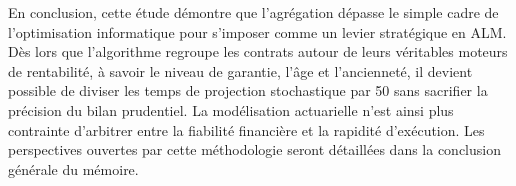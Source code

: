 En conclusion, cette étude démontre que l'agrégation dépasse le simple cadre de l'optimisation informatique pour s'imposer comme un levier stratégique en ALM. Dès lors que l'algorithme regroupe les contrats autour de leurs véritables moteurs de rentabilité, à savoir le niveau de garantie, l'âge et l'ancienneté, il devient possible de diviser les temps de projection stochastique par 50 sans sacrifier la précision du bilan prudentiel. La modélisation actuarielle n'est ainsi plus contrainte d'arbitrer entre la fiabilité financière et la rapidité d'exécution. Les perspectives ouvertes par cette méthodologie seront détaillées dans la conclusion générale du mémoire.
